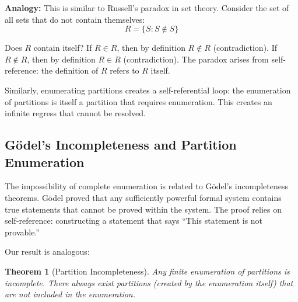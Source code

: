 \documentclass[twocolumn,10pt]{article}
\newtheorem{theorem}{Theorem}[section]
\theoremstyle{definition}
\theoremstyle{remark}
\begin{document}
\noindent\textbf{Analogy:} This is similar to Russell's paradox in set theory. Consider the set of all sets that do not contain themselves:
\begin{equation}
R = \{S : S \notin S\}
\end{equation}

Does $R$ contain itself? If $R \in R$, then by definition $R \notin R$ (contradiction). If $R \notin R$, then by definition $R \in R$ (contradiction). The paradox arises from self-reference: the definition of $R$ refers to $R$ itself.

\vspace{0.2cm}
\noindent Similarly, enumerating partitions creates a self-referential loop: the enumeration of partitions is itself a partition that requires enumeration. This creates an infinite regress that cannot be resolved.

\subsection{Gödel's Incompleteness and Partition Enumeration}

The impossibility of complete enumeration is related to Gödel's incompleteness theorems\cite{godel1931}. Gödel proved that any sufficiently powerful formal system contains true statements that cannot be proved within the system. The proof relies on self-reference: constructing a statement that says ``This statement is not provable.''

\vspace{0.2cm}
\noindent Our result is analogous:

\begin{theorem}[Partition Incompleteness]
\label{thm:partition_incompleteness}
Any finite enumeration of partitions is incomplete. There always exist partitions (created by the enumeration itself) that are not included in the enumeration.
\end{theorem}
\end{document}
